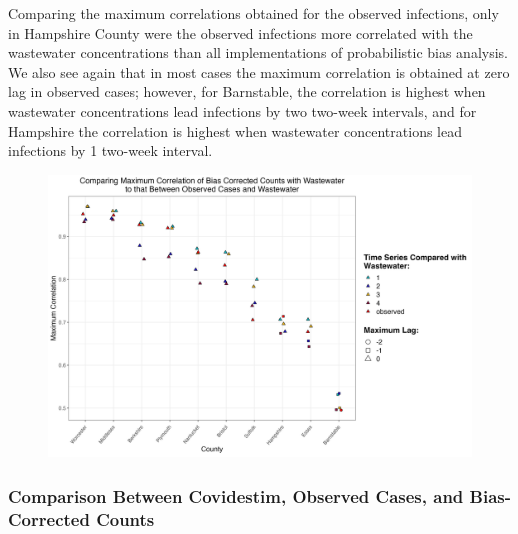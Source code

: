 \documentclass[12pt,twoside]{smiththesis}
\begin{document}
Comparing the maximum correlations obtained for the observed infections, only in Hampshire County were the observed infections more correlated with the wastewater concentrations than all implementations of probabilistic bias analysis. We also see again that in most cases the maximum correlation is obtained at zero lag in observed cases; however, for Barnstable, the correlation is highest when wastewater concentrations lead infections by two two-week intervals, and for Hampshire the correlation is highest when wastewater concentrations lead infections by 1 two-week interval.
\begin{figure}
\includegraphics[width=1\linewidth]{figure/correlation_observed_pb} \caption{\label{fig:correlation_observed_pb}}\label{fig:unnamed-chunk-30}
\end{figure}
\hypertarget{comparison-between-covidestim-observed-cases-and-bias-corrected-counts}{%
\subsubsection{Comparison Between Covidestim, Observed Cases, and Bias-Corrected Counts}\label{comparison-between-covidestim-observed-cases-and-bias-corrected-counts}}
\end{document}
